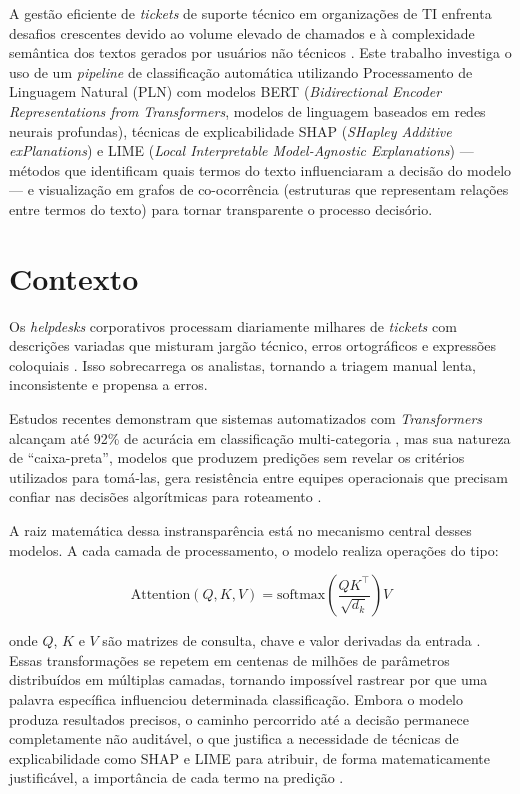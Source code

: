 \documentclass[
    12pt,                %
    openright,           %
    oneside,             %
    a4paper,             %
    english,             %
    brazil               %
]{abntex2}
\begin{document}
A gestão eficiente de \textit{tickets} de suporte técnico em 
organizações de TI enfrenta desafios crescentes devido ao 
volume elevado de chamados e à complexidade semântica dos 
textos gerados por usuários não técnicos \cite{zemp2021, 
razma2026}. Este trabalho investiga o uso de um 
\textit{pipeline} de classificação automática utilizando 
Processamento de Linguagem Natural (PLN) com modelos BERT 
(\textit{Bidirectional Encoder Representations from 
Transformers}, modelos de linguagem baseados em redes neurais 
profundas), técnicas de explicabilidade SHAP 
(\textit{SHapley Additive exPlanations}) e LIME 
(\textit{Local Interpretable Model-Agnostic Explanations}) 
— métodos que identificam quais termos do texto influenciaram 
a decisão do modelo — e visualização em grafos de 
co-ocorrência (estruturas que representam relações entre 
termos do texto) para tornar transparente o processo 
decisório.

\section{Contexto}
\label{sec:contexto}

Os \textit{helpdesks} corporativos processam diariamente milhares 
de \textit{tickets} com descrições variadas que misturam jargão 
técnico, erros ortográficos e expressões coloquiais \cite{zemp2021}. 
Isso sobrecarrega os analistas, tornando a triagem manual lenta, 
inconsistente e propensa a erros.

Estudos recentes demonstram que sistemas automatizados com 
\textit{Transformers} alcançam até 92\% de acurácia em classificação 
multi-categoria \cite{zemp2021}, mas sua natureza de ``caixa-preta'', 
modelos que produzem predições sem revelar os critérios utilizados 
para tomá-las, gera resistência entre equipes operacionais que 
precisam confiar nas decisões algorítmicas para roteamento 
\cite{razma2026}.

A raiz matemática dessa instransparência está no mecanismo central 
desses modelos. A cada camada de processamento, o modelo realiza 
operações do tipo:

\begin{equation*}
\text{Attention}(Q, K, V) = 
\text{softmax}\!\left(\frac{QK^{\top}}{\sqrt{d_k}}\right)V
\end{equation*}

onde $Q$, $K$ e $V$ são matrizes de consulta, chave e valor 
derivadas da entrada \cite{vaswani2017}. Essas transformações 
se repetem em centenas de milhões de parâmetros distribuídos 
em múltiplas camadas, tornando impossível rastrear por que uma 
palavra específica influenciou determinada classificação. Embora 
o modelo produza resultados precisos, o caminho percorrido até 
a decisão permanece completamente não auditável, o que justifica a 
necessidade de técnicas de explicabilidade como SHAP e LIME para 
atribuir, de forma matematicamente justificável, a importância 
de cada termo na predição \cite{lundberg2017, ribeiro2016}.
\end{document}
